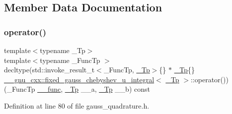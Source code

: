 \subsection{Member Data Documentation}
\mbox{\label{struct____gnu__cxx_1_1fixed__gauss__chebyshev__u__integral_a2d37d0d8a816c260b98b4edc2e348b24}} 
\subsubsection{\texorpdfstring{operator()}{operator()}}
{\footnotesize\ttfamily template$<$typename \+\_\+\+Tp$>$ \\
template$<$typename \+\_\+\+Func\+Tp $>$ \\
decltype(std\+::invoke\+\_\+result\+\_\+t$<$\+\_\+\+Func\+Tp, \hyperlink{namespace____gnu__cxx_a3b19a9c800ca194374ef9172290f7d79}{\+\_\+\+Tp}$>$\{\} $\ast$ \hyperlink{namespace____gnu__cxx_a3b19a9c800ca194374ef9172290f7d79}{\+\_\+\+Tp}\{\} \hyperlink{struct____gnu__cxx_1_1fixed__gauss__chebyshev__u__integral}{\+\_\+\+\_\+gnu\+\_\+cxx\+::fixed\+\_\+gauss\+\_\+chebyshev\+\_\+u\+\_\+integral}$<$ \hyperlink{namespace____gnu__cxx_a3b19a9c800ca194374ef9172290f7d79}{\+\_\+\+Tp} $>$\+::operator()) (\+\_\+\+Func\+Tp \hyperlink{namespace____gnu__cxx_af2b2f0c7a2ae72b922b1afefae5a65b2}{\+\_\+\+\_\+func}, \hyperlink{namespace____gnu__cxx_a3b19a9c800ca194374ef9172290f7d79}{\+\_\+\+Tp} \+\_\+\+\_\+a, \hyperlink{namespace____gnu__cxx_a3b19a9c800ca194374ef9172290f7d79}{\+\_\+\+Tp} \+\_\+\+\_\+b) const}



Definition at line 80 of file gauss\+\_\+quadrature.\+h.

\mbox{\label{struct____gnu__cxx_1_1fixed__gauss__chebyshev__u__integral_a497180b192f0df1eb43c488537a861ca}} 
